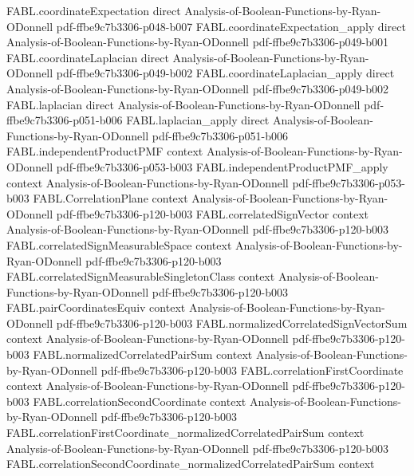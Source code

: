 \begin{theorem}
\proofstep
  {FABL.coordinateExpectation}
  {direct}
  {Analysis-of-Boolean-Functions-by-Ryan-ODonnell}
  {pdf-ffbe9c7b3306-p048-b007}
\proofstep
  {FABL.coordinateExpectation_apply}
  {direct}
  {Analysis-of-Boolean-Functions-by-Ryan-ODonnell}
  {pdf-ffbe9c7b3306-p049-b001}
\proofstep
  {FABL.coordinateLaplacian}
  {direct}
  {Analysis-of-Boolean-Functions-by-Ryan-ODonnell}
  {pdf-ffbe9c7b3306-p049-b002}
\proofstep
  {FABL.coordinateLaplacian_apply}
  {direct}
  {Analysis-of-Boolean-Functions-by-Ryan-ODonnell}
  {pdf-ffbe9c7b3306-p049-b002}
\proofstep
  {FABL.laplacian}
  {direct}
  {Analysis-of-Boolean-Functions-by-Ryan-ODonnell}
  {pdf-ffbe9c7b3306-p051-b006}
\proofstep
  {FABL.laplacian_apply}
  {direct}
  {Analysis-of-Boolean-Functions-by-Ryan-ODonnell}
  {pdf-ffbe9c7b3306-p051-b006}
\proofstep
  {FABL.independentProductPMF}
  {context}
  {Analysis-of-Boolean-Functions-by-Ryan-ODonnell}
  {pdf-ffbe9c7b3306-p053-b003}
\proofstep
  {FABL.independentProductPMF_apply}
  {context}
  {Analysis-of-Boolean-Functions-by-Ryan-ODonnell}
  {pdf-ffbe9c7b3306-p053-b003}
\proofstep
  {FABL.CorrelationPlane}
  {context}
  {Analysis-of-Boolean-Functions-by-Ryan-ODonnell}
  {pdf-ffbe9c7b3306-p120-b003}
\proofstep
  {FABL.correlatedSignVector}
  {context}
  {Analysis-of-Boolean-Functions-by-Ryan-ODonnell}
  {pdf-ffbe9c7b3306-p120-b003}
\proofstep
  {FABL.correlatedSignMeasurableSpace}
  {context}
  {Analysis-of-Boolean-Functions-by-Ryan-ODonnell}
  {pdf-ffbe9c7b3306-p120-b003}
\proofstep
  {FABL.correlatedSignMeasurableSingletonClass}
  {context}
  {Analysis-of-Boolean-Functions-by-Ryan-ODonnell}
  {pdf-ffbe9c7b3306-p120-b003}
\proofstep
  {FABL.pairCoordinatesEquiv}
  {context}
  {Analysis-of-Boolean-Functions-by-Ryan-ODonnell}
  {pdf-ffbe9c7b3306-p120-b003}
\proofstep
  {FABL.normalizedCorrelatedSignVectorSum}
  {context}
  {Analysis-of-Boolean-Functions-by-Ryan-ODonnell}
  {pdf-ffbe9c7b3306-p120-b003}
\proofstep
  {FABL.normalizedCorrelatedPairSum}
  {context}
  {Analysis-of-Boolean-Functions-by-Ryan-ODonnell}
  {pdf-ffbe9c7b3306-p120-b003}
\proofstep
  {FABL.correlationFirstCoordinate}
  {context}
  {Analysis-of-Boolean-Functions-by-Ryan-ODonnell}
  {pdf-ffbe9c7b3306-p120-b003}
\proofstep
  {FABL.correlationSecondCoordinate}
  {context}
  {Analysis-of-Boolean-Functions-by-Ryan-ODonnell}
  {pdf-ffbe9c7b3306-p120-b003}
\proofstep
  {FABL.correlationFirstCoordinate_normalizedCorrelatedPairSum}
  {context}
  {Analysis-of-Boolean-Functions-by-Ryan-ODonnell}
  {pdf-ffbe9c7b3306-p120-b003}
\proofstep
  {FABL.correlationSecondCoordinate_normalizedCorrelatedPairSum}
  {context}

\end{theorem}
